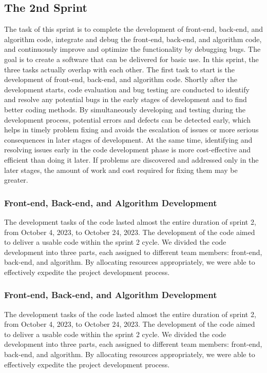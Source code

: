 \documentclass[journal]{IEEEtran}
\begin{document}
\subsection{The 2nd Sprint}
The task of this sprint is to complete the development of front-end, back-end, and algorithm code, integrate and debug the front-end, back-end, and algorithm code, and continuously improve and optimize the functionality by debugging bugs. The goal is to create a software that can be delivered for basic use. In this sprint, the three tasks actually overlap with each other. The first task to start is the development of front-end, back-end, and algorithm code. Shortly after the development starts, code evaluation and bug testing are conducted to identify and resolve any potential bugs in the early stages of development and to find better coding methods. By simultaneously developing and testing during the development process, potential errors and defects can be detected early, which helps in timely problem fixing and avoids the escalation of issues or more serious consequences in later stages of development. At the same time, identifying and resolving issues early in the code development phase is more cost-effective and efficient than doing it later. If problems are discovered and addressed only in the later stages, the amount of work and cost required for fixing them may be greater.

\subsubsection{Front-end, Back-end, and Algorithm Development}
The development tasks of the code lasted almost the entire duration of sprint 2, from October 4, 2023, to October 24, 2023. The development of the code aimed to deliver a usable code within the sprint 2 cycle. We divided the code development into three parts, each assigned to different team members: front-end, back-end, and algorithm. By allocating resources appropriately, we were able to effectively expedite the project development process. 

\subsubsection{Front-end, Back-end, and Algorithm Development}
The development tasks of the code lasted almost the entire duration of sprint 2, from October 4, 2023, to October 24, 2023. The development of the code aimed to deliver a usable code within the sprint 2 cycle. We divided the code development into three parts, each assigned to different team members: front-end, back-end, and algorithm. By allocating resources appropriately, we were able to effectively expedite the project development process.
\end{document}
